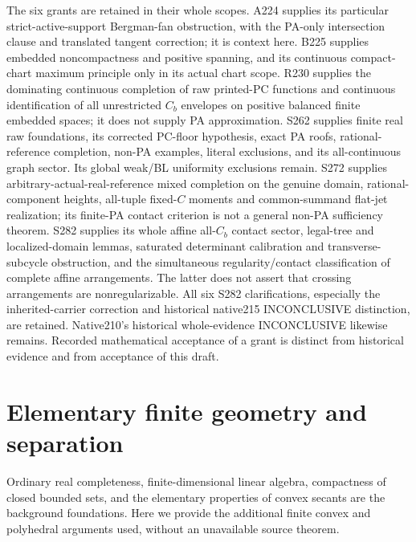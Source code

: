 \documentclass[11pt]{article}
\begin{document}
The six grants are retained in their whole scopes. A224 supplies its particular strict-active-support Bergman-fan obstruction, with the PA-only intersection clause and translated tangent correction; it is context here. B225 supplies embedded noncompactness and positive spanning, and its continuous compact-chart maximum principle only in its actual chart scope. R230 supplies the dominating continuous completion of raw printed-PC functions and continuous identification of all unrestricted $C_b$ envelopes on positive balanced finite embedded spaces; it does not supply PA approximation. S262 supplies finite real raw foundations, its corrected PC-floor hypothesis, exact PA roofs, rational-reference completion, non-PA examples, literal exclusions, and its all-continuous graph sector. Its global weak/BL uniformity exclusions remain. S272 supplies arbitrary-actual-real-reference mixed completion on the genuine domain, rational-component heights, all-tuple fixed-$C$ moments and common-summand flat-jet realization; its finite-PA contact criterion is not a general non-PA sufficiency theorem. S282 supplies its whole affine all-$C_b$ contact sector, legal-tree and localized-domain lemmas, saturated determinant calibration and transverse-subcycle obstruction, and the simultaneous regularity/contact classification of complete affine arrangements. The latter does not assert that crossing arrangements are nonregularizable. All six S282 clarifications, especially the inherited-carrier correction and historical native215 INCONCLUSIVE distinction, are retained. Native210's historical whole-evidence INCONCLUSIVE likewise remains. Recorded mathematical acceptance of a grant is distinct from historical evidence and from acceptance of this draft.

\section{Elementary finite geometry and separation}\label{sec:foundations}
Ordinary real completeness, finite-dimensional linear algebra, compactness of closed bounded sets, and the elementary properties of convex secants are the background foundations. Here we provide the additional finite convex and polyhedral arguments used, without an unavailable source theorem.
\end{document}
